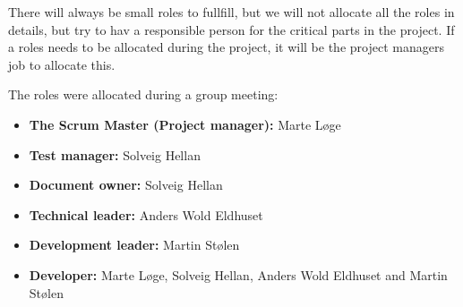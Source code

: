 There will always be small roles to fullfill, but we will not allocate all the roles in details, 
but try to hav a responsible person for the critical parts in the project.
If a roles needs to be allocated during the project, it will be the project managers job to
allocate this.

The roles were allocated during a group meeting:
\begin{itemize}
  \item {\bf The Scrum Master (Project manager):} Marte Løge
  \item {\bf Test manager:} Solveig Hellan
  \item {\bf Document owner:} Solveig Hellan
  \item {\bf Technical leader:} Anders Wold Eldhuset
  \item {\bf Development leader:} Martin Stølen
  \item {\bf Developer:} Marte Løge, Solveig Hellan, Anders Wold Eldhuset and Martin Stølen
\end{itemize}





